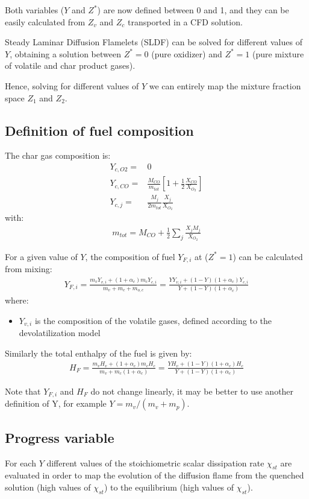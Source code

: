 \documentclass[]{scrartcl}
\begin{document}
Both variables ($Y$ and $Z^*$) are now defined between 0 and 1, and they can be easily calculated from $Z_v$ and $Z_c$ transported in a CFD solution.

Steady Laminar Diffusion Flamelets (SLDF) can be solved for different values of $Y$, obtaining a solution between $Z^*=0$ (pure oxidizer) and $Z^*=1$ (pure mixture of volatile and char product gases).

Hence, solving for different values of $Y$ we can entirely map the mixture fraction space $Z_1$ and $Z_2$.

\subsection{Definition of fuel composition}
The char gas composition is:
\begin{eqnarray}
Y_{c,O2} =& 0\\
Y_{c,CO} = & \frac{M_{CO}}{m_{tot}} [1+\frac{1}{2}\frac{X_{CO}}{X_{O_2}}]\\
Y_{c,j} = & \frac{M_j}{2 m_{tot}} \frac{ X_{j}}{X_{O_2}}
\end{eqnarray}
with:
\begin{eqnarray}
m_{tot} = M_{CO}+\frac{1}{2}\sum_j\frac{X_{j}M_j}{X_{O_2}}
\end{eqnarray}

For a given value of $Y$, the composition of fuel $Y_{F,i}$ at ($Z^*=1$) can be calculated from mixing:
\begin{eqnarray}
Y_{F, i} = \frac{m_v Y_{v, i}+ (1+\alpha_c) m_c Y_{c, i}}{m_v + m_c + m_{o,c}} = \frac{Y Y_{v, i} + (1-Y)(1+\alpha_c)Y_{c, i}}{Y + (1-Y)(1+\alpha_c)}
\end{eqnarray}
where:
\begin{itemize}
\item $Y_{v, i}$ is the composition of the volatile gases, defined according to the devolatilization model
\end{itemize}

Similarly the total enthalpy of the fuel is given by:
\begin{eqnarray}
H_F = \frac{m_v H_v+ (1+\alpha_c) m_c H_c}{m_v + m_c(1+\alpha_c)} = \frac{Y H_v + (1-Y)(1+\alpha_c)H_c}{Y + (1-Y)(1+\alpha_c)}
\end{eqnarray}

Note that $Y_{F,i}$ and $H_F$ do not change linearly, it may be better to use another definition of Y, for example $Y=m_v/(m_v + m_p)$.

\subsection{Progress variable}
For each $Y$ different values of the stoichiometric scalar dissipation rate $\chi_{st}$ are evaluated in order to map the evolution of the diffusion flame from the quenched solution (high values of $\chi_{st}$) to the equilibrium (high values of $\chi_{st}$).
\end{document}
